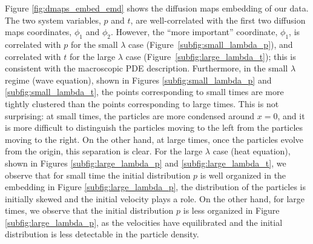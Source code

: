\documentclass[prl, reprint, final, showkeys]{revtex4-1}
\begin{document}
Figure \ref{fig:dmaps_embed_emd} shows the diffusion maps embedding of our data.
%
The two system variables, $p$ and $t$, are well-correlated with the first two diffusion maps coordinates, $\phi_1$ and $\phi_2$. 
%
However, the ``more important'' coordinate, $\phi_1$, is correlated with $p$ for the small $\lambda$ case (Figure~\ref{subfig:small_lambda_p}), and correlated with $t$ for the large $\lambda$ case (Figure~\ref{subfig:large_lambda_t}); 
this is consistent with the macroscopic PDE description.
%
Furthermore, in the small $\lambda$ regime (wave equation), shown in Figures \ref{subfig:small_lambda_p} and \ref{subfig:small_lambda_t}, the points corresponding to small times are more tightly clustered than the points corresponding to large times.
%
This is not surprising: at small times, the particles are more condensed around $x=0$, and it is more difficult to distinguish the particles moving to the left from the particles moving to the right. 
%
On the other hand, at large times, once the particles evolve from the origin, this separation is clear.  
%
For the large $\lambda$ case (heat equation), shown in Figures \ref{subfig:large_lambda_p} and \ref{subfig:large_lambda_t}, we observe that for small time the initial distribution $p$ is well organized in the embedding in Figure \ref{subfig:large_lambda_p}, the distribution of the particles is initially skewed and the initial velocity plays a role. 
%
On the other hand, for large times, we observe that the initial distribution $p$ is less organized in Figure \ref{subfig:large_lambda_p}, as the velocities have equilibrated and the initial distribution is less detectable in the particle density.

\end{document}
